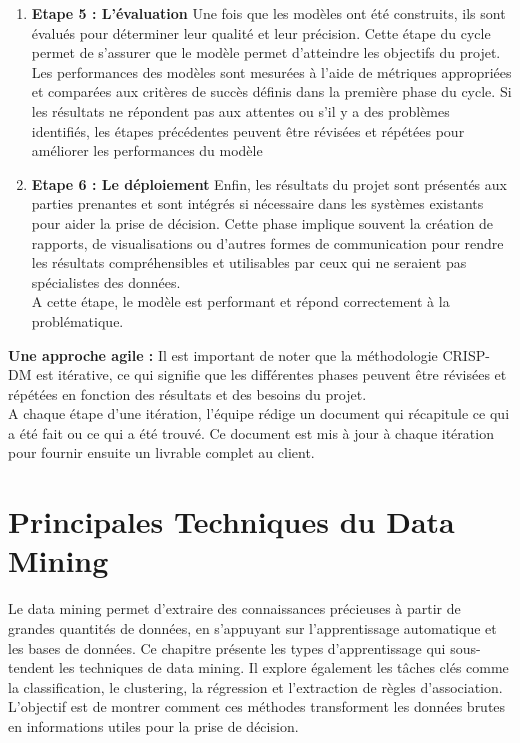 \documentclass[a4paper,14pt]{article}
\begin{document}
\begin{enumerate}
            \item \textbf{Etape 5 : L’évaluation}
            Une fois que les modèles ont été construits, ils sont évalués pour déterminer leur qualité et leur précision. Cette étape du cycle permet de s’assurer que le modèle permet d’atteindre les objectifs du projet. \\
            Les performances des modèles sont mesurées à l'aide de métriques appropriées et comparées aux critères de succès définis dans la première phase du cycle. Si les résultats ne répondent pas aux attentes ou s'il y a des problèmes identifiés, les étapes précédentes peuvent être révisées et répétées pour améliorer les performances du modèle
    
    
            \item \textbf{Etape 6 : Le déploiement}
            Enfin, les résultats du projet sont présentés aux parties prenantes et sont intégrés si nécessaire dans les systèmes existants pour aider la prise de décision. Cette phase implique souvent la création de rapports, de visualisations ou d'autres formes de communication pour rendre les résultats compréhensibles et utilisables par ceux qui ne seraient pas spécialistes des données. \\
            A cette étape, le modèle est performant et répond correctement à la problématique.
        \end{enumerate}

        \textbf{Une approche agile : }
        Il est important de noter que la méthodologie CRISP-DM est itérative, ce qui signifie que les différentes phases peuvent être révisées et répétées en fonction des résultats et des besoins du projet.\\
        A chaque étape d’une itération, l’équipe rédige un document qui récapitule ce qui a été fait ou ce qui a été trouvé. Ce document est mis à jour à chaque itération pour fournir ensuite un livrable complet au client.

        
\section{ Principales Techniques du Data Mining}

    

    Le data mining permet d’extraire des connaissances précieuses à partir de grandes quantités de données, en s’appuyant sur l’apprentissage automatique et les bases de données. Ce chapitre présente les types d’apprentissage qui sous-tendent les techniques de data mining. Il explore également les tâches clés comme la classification, le clustering, la régression et l’extraction de règles d’association. L’objectif est de montrer comment ces méthodes transforment les données brutes en informations utiles pour la prise de décision.
\end{document}
